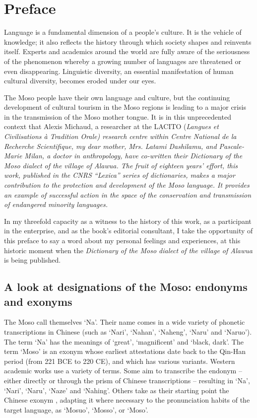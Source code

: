 \languefra

\chapter*{Preface}

Language is a fundamental dimension of a people's culture. It is the vehicle of knowledge; it also reflects the history through which society shapes and reinvents itself. Experts and academics around the world are fully aware of the seriousness of the phenomenon whereby a growing number of languages are threatened or even disappearing. Linguistic diversity, an essential manifestation of human cultural diversity, becomes eroded under our eyes.

The Moso people have their own language and culture, but the continuing development of cultural tourism in the Moso regions is leading to a major crisis in the transmission of the Moso mother tongue. It is in this unprecedented context that Alexis Michaud, a researcher at the LACITO (\em{Langues et Civilisations à Tradition Orale}) research centre within \emph{Centre National de la Recherche Scientifique}, my dear mother, Mrs. Latami Dashilamu, and Pascale-Marie Milan, a doctor in anthropology, have co-written their \emph{Dictionary of the Moso dialect of the village of Alawua}. The fruit of eighteen years' effort, this work, published in the CNRS “Lexica” series of dictionaries, makes a major contribution to the protection and development of the Moso language. It provides an example of successful action in the space of the conservation and transmission of endangered minority languages.

In my threefold capacity as a witness to the history of this work, as a participant in the enterprise, and as the book's editorial consultant, I take the opportunity of this preface to say a word about my personal feelings and experiences, at this historic moment when the \emph{Dictionary of the Moso dialect of the village of Alawua} is being published.

\section*{A look at designations of the Moso: endonyms and exonyms}

The Moso call themselves ‘Na’. Their name comes in a wide variety of phonetic transcriptions in Chinese (such as ‘Nari’, ‘Nahan’, ‘Naheng’, ‘Naru’ and ‘Naruo’). The term ‘Na’ has the meanings of ‘great’, ‘magnificent’ and ‘black, dark’. The term ‘Moso’ is an exonym whose earliest attestations date back to the Qin-Han period (from 221 BCE to 220 CE), and which has various variants. Western academic works use a variety of terms. Some aim to transcribe the endonym -- either directly or through the prism of Chinese transcriptions -- resulting in ‘Na’, ‘Nari’, ‘Naru’, ‘Naze’ and ‘Nahing’. Others take as their starting point the Chinese exonym , adapting it where necessary to the pronunciation habits of the target language, as ‘Mosuo’, ‘Mosso’, or ‘Moso’.

